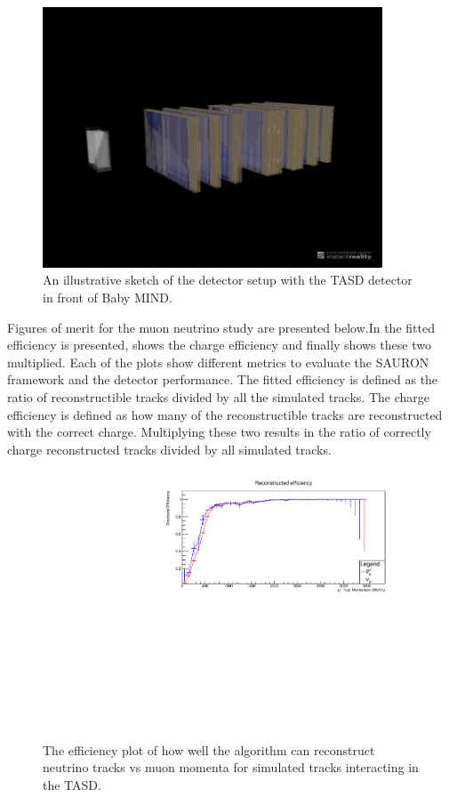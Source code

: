 \begin{figure}[h!]
\centering
\includegraphics[width=0.9\textwidth]{figures/MINDAida.jpeg}
\caption{An illustrative sketch of the detector setup with the TASD detector in front of Baby MIND.}
\label{fig:TASDandMIND}
\end{figure}

Figures of merit for the muon neutrino study are presented below.In  the fitted efficiency is presented,  shows the charge efficiency and finally  shows these two multiplied. Each of the plots show different metrics to evaluate the SAURON framework and the detector performance. The fitted efficiency is defined as the ratio of reconstructible tracks divided by all the simulated tracks. The charge efficiency is defined as how many of the reconstructible tracks are reconstructed with the correct charge. Multiplying these two results in the ratio of correctly charge reconstructed tracks divided by all simulated tracks.

\begin{figure}[h!]
\centering
\includegraphics[width=.9\textwidth]{figures/NeutrinoChap/Neutrino/NuStormRecEff.pdf}
\caption{The efficiency plot of how well the algorithm can reconstruct neutrino tracks vs muon momenta for simulated tracks interacting in the TASD.}
\label{fig:NuSTORMTASDfitted}
\end{figure}

